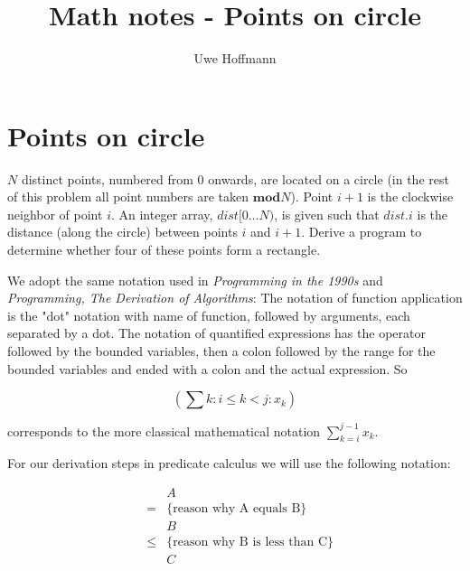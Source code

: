 

\title{Math notes - Points on circle}
\author{Uwe Hoffmann}



\setcounter{chapter}{1}
\section*{Points on circle}

\vspace{10 mm}
\begin{problem}
$N$ distinct points, numbered from $0$ onwards, are located on a circle (in the rest of this problem all point numbers are taken $\mathbf{mod} N$). Point $i + 1$ is the clockwise neighbor of point $i$. An integer array, $dist[0 \ldots N)$, is given such that $dist.i$ is the distance (along the circle) between points $i$ and  $i + 1$. Derive a program to determine whether four of these points form a rectangle.
\end{problem}

We adopt the same notation used in \textit{Programming in the 1990s} \cite{Cohen90} and \textit{Programming, The Derivation of Algorithms}\cite{Kaldewaij90}: The notation of function application is the "dot" notation with name of function, followed by arguments, each separated by a dot. The notation of quantified expressions has the operator followed by the bounded variables, then a colon followed by the range for the bounded variables and ended with a colon and the actual expression. So

\begin{equation*}	 
	(\sum k : i \leq k < j : x_k)
\end{equation*}

\noindent corresponds to the more classical mathematical notation $\sum_{k = i}^{ j - 1}x_k$. 

\noindent For our derivation steps in predicate calculus we will use the following notation:

\begin{equation*}
\begin{array}{lcl}
		&&A \\
	      &=& \{  \mbox{reason why A equals B} \} \\      
                  &&B \\
                &\leq& \{ \mbox{reason why B is less than C} \} \\
                  && C  
   \end{array}
\end{equation*}

